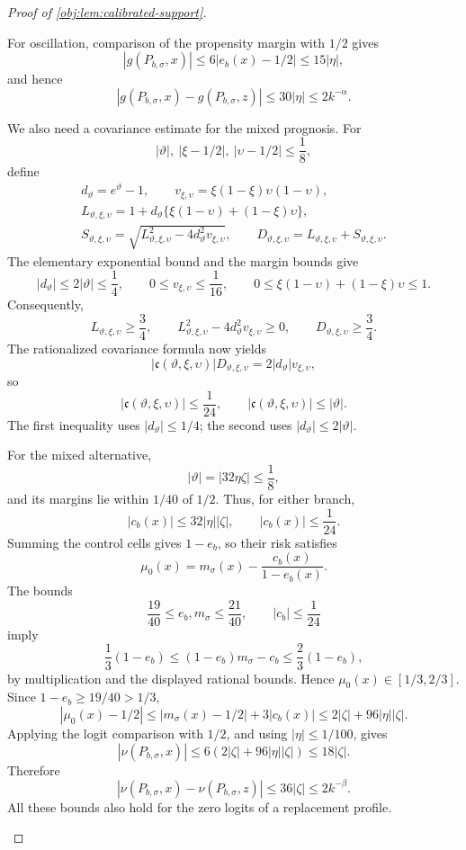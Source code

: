 \documentclass[11pt]{article}
\begin{document}
\begin{proof}[Proof of \cref{obj:lem:calibrated-support}]
\begin{enumerate}
For oscillation, comparison of the propensity margin with \(1/2\) gives
\[
|g(P_{b,\sigma},x)|
\le6|e_b(x)-1/2|\le15|\eta|,
\]
and hence
\[
|g(P_{b,\sigma},x)-g(P_{b,\sigma},z)|
\le30|\eta|
\le2k^{-\alpha}.
\]

We also need a covariance estimate for the mixed prognosis. For
\[
|\vartheta|,\ |\xi-1/2|,\ |\upsilon-1/2|\le\frac18,
\]
define
\[
\begin{gathered}
d_\vartheta=e^\vartheta-1,\qquad
v_{\xi,\upsilon}=\xi(1-\xi)\upsilon(1-\upsilon),\\
L_{\vartheta,\xi,\upsilon}
=1+d_\vartheta\{\xi(1-\upsilon)+(1-\xi)\upsilon\},\\
S_{\vartheta,\xi,\upsilon}
=\sqrt{L_{\vartheta,\xi,\upsilon}^2
              -4d_\vartheta^2v_{\xi,\upsilon}},\qquad
D_{\vartheta,\xi,\upsilon}
=L_{\vartheta,\xi,\upsilon}+S_{\vartheta,\xi,\upsilon}.
\end{gathered}
\]
The elementary exponential bound and the margin bounds give
\[
|d_\vartheta|\le2|\vartheta|\le\frac14,\qquad
0\le v_{\xi,\upsilon}\le\frac1{16},\qquad
0\le\xi(1-\upsilon)+(1-\xi)\upsilon\le1.
\]
Consequently,
\[
L_{\vartheta,\xi,\upsilon}\ge\frac34,\qquad
L_{\vartheta,\xi,\upsilon}^2
       -4d_\vartheta^2v_{\xi,\upsilon}\ge0,
\qquad
D_{\vartheta,\xi,\upsilon}\ge\frac34.
\]
The rationalized covariance formula now yields
\[
|\mathfrak c(\vartheta,\xi,\upsilon)|
D_{\vartheta,\xi,\upsilon}
=2|d_\vartheta|v_{\xi,\upsilon},
\]
so
\[
|\mathfrak c(\vartheta,\xi,\upsilon)|
\le\frac1{24},
\qquad
|\mathfrak c(\vartheta,\xi,\upsilon)|
\le|\vartheta|.
\]
The first inequality uses \(|d_\vartheta|\le1/4\); the second uses
\(|d_\vartheta|\le2|\vartheta|\).

For the mixed alternative,
\[
|\vartheta|=|32\eta\zeta|\le\frac18,
\]
and its margins lie within \(1/40\) of \(1/2\). Thus, for either branch,
\[
|c_b(x)|\le32|\eta||\zeta|,
\qquad |c_b(x)|\le\frac1{24}.
\]
Summing the control cells gives \(1-e_b\), so their risk satisfies
\[
\mu_0(x)=m_\sigma(x)-\frac{c_b(x)}{1-e_b(x)}.
\]
The bounds
\[
\frac{19}{40}\le e_b,m_\sigma\le\frac{21}{40},
\qquad |c_b|\le\frac1{24}
\]
imply
\[
\frac13(1-e_b)\le(1-e_b)m_\sigma-c_b
                 \le\frac23(1-e_b),
\]
by multiplication and the displayed rational bounds. Hence
\(\mu_0(x)\in[1/3,2/3]\). Since \(1-e_b\ge19/40>1/3\),
\[
|\mu_0(x)-1/2|
\le|m_\sigma(x)-1/2|+3|c_b(x)|
\le2|\zeta|+96|\eta||\zeta|.
\]
Applying the logit comparison with \(1/2\), and using \(|\eta|\le1/100\), gives
\[
|\nu(P_{b,\sigma},x)|
\le6(2|\zeta|+96|\eta||\zeta|)
\le18|\zeta|.
\]
Therefore
\[
|\nu(P_{b,\sigma},x)-\nu(P_{b,\sigma},z)|
\le36|\zeta|\le2k^{-\beta}.
\]
All these bounds also hold for the zero logits of a replacement profile.


\end{enumerate}
\end{proof}
\end{document}
